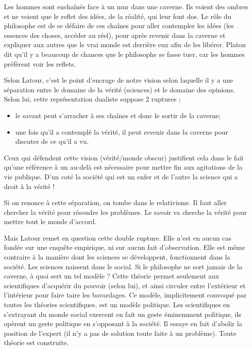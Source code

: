 \documentclass[11pt,a4paper]{article} %
\begin{document}
Les hommes sont enchaînés face à un mur dans une caverne.
Ils voient des ombres et ne voient que le reflet des idées, de la réalité, qui leur font dos.
Le rôle du philosophe est de se défaire de ces chaînes pour aller contempler les idées (les essences des choses, accéder au réel), pour après revenir dans la caverne et expliquer aux autres que le vrai monde est derrière eux afin de les libérer.
Platon dit qu'il y a beaucoup de chances que le philosophe se fasse tuer, car les hommes préfèrent voir les reflets.

Selon Latour, c'est le point d'encrage de notre vision selon laquelle il y a une séparation entre le domaine de la vérité (sciences) et le domaine des opinions.
Selon lui, cette représentation dualiste suppose 2 ruptures ;
\begin{itemize}
	\item le savant peut s'arracher à ses chaînes et donc le sortir de la caverne;
	\item une fois qu'il a contemplé la vérité, il peut revenir dans la caverne pour discuter de ce qu'il a vu.
\end{itemize}
Ceux qui défendent cette vision (vérité/monde obscur) justifient cela dans le fait qu'une référence à un au-delà est nécessaire pour mettre fin aux agitations de la vie publique.
D'un coté la société qui est un enfer et de l'autre la science qui a droit à la vérité !

Si on renonce à cette séparation, on tombe dans le relativisme.
Il faut aller chercher la vérité pour résoudre les problèmes.
Le savoir va cherche la vérité pour mettre tout le monde d'accord.

Mais Latour remet en question cette double rupture.
Elle n'est en aucun cas fondée sur une enquête empirique, ni sur aucun fait d'observation.
Elle est même contraire à la manière dont les sciences se développent, fonctionnent dans la société.
Les sciences naissent dans le social.
Si le philosophe ne sort jamais de la caverne, à quoi sert un tel modèle ? Cette théorie permet seulement aux scientifiques d'acquérir du pouvoir (selon lui), et ainsi circuler entre l'extérieur et l'intérieur pour faire taire les bavardages.
Ce modèle, implicitement convoqué par  toutes les théories scientifiques, est un modèle politique.
Les scientifiques en s'extrayant du monde social exercent en fait un geste éminemment politique, ils opèrent un geste politique en s'opposant à la société.
Il essaye en fait d'abolir la position de l'expert (il n'y a pas de solution toute faite à un problème).
Toute théorie est construite.
\end{document}
